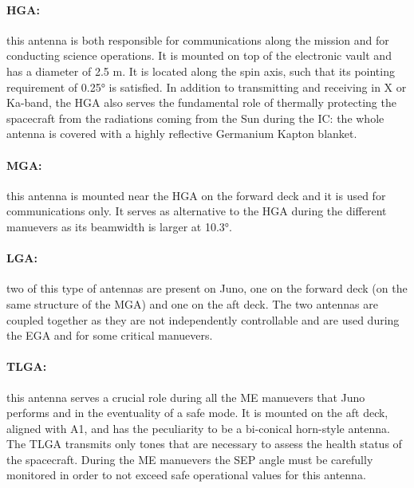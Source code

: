 \vspace{-1mm}

\paragraph{HGA:}this antenna is both responsible for communications along the mission and for conducting science operations. \cite{juno_telecommunication}
It is mounted on top of the electronic vault and has a diameter of 2.5 m. It is located along the spin axis, such that its pointing requirement of 0.25° is satisfied. \cite{telecommunication_antennas}
In addition to transmitting and receiving in X or Ka-band, the HGA also serves the fundamental role of thermally protecting the spacecraft from the radiations coming from the Sun during the IC: the whole antenna is covered with a highly reflective Germanium Kapton blanket. \cite{ge_kapton}

\vspace{-4mm}

\paragraph{MGA:}this antenna is mounted near the HGA on the forward deck and it is used for communications only.
It serves as alternative to the HGA during the different manuevers as its beamwidth is larger at 10.3°.\cite{juno_telecommunication} 

\vspace{-4mm}

\paragraph{LGA:}two of this type of antennas are present on Juno, one on the forward deck (on the same structure of the MGA) and one on the aft deck.
The two antennas are coupled together as they are not independently controllable and are used during the EGA and for some critical manuevers. \cite{juno_telecommunication}

\vspace{-4mm}

\paragraph{TLGA:}this antenna serves a crucial role during all the ME manuevers that Juno performs and in the eventuality of a safe mode.
It is mounted on the aft deck, aligned with A1, and has the peculiarity to be a bi-conical horn-style antenna.
The TLGA transmits only tones that are necessary to assess the health status of the spacecraft.
During the ME manuevers the SEP angle must be carefully monitored in order to not exceed safe operational values for this antenna. \cite{juno_telecommunication}

